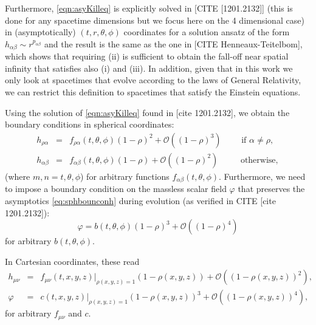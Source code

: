 \documentclass[a4paper,11pt]{article}
\begin{document}
Furthermore, \eqref{eqn:asyKilleq} is explicitly solved in [CITE [1201.2132]] (this is done for any spacetime dimensions but we focus here on the 4 dimensional case) in (asymptotically) $(t,r,\theta,\phi)$ coordinates for a solution ansatz of the form $h_{\alpha\beta}\sim r^{p_{\alpha\beta}}$ and the result is the same as the one in [CITE Henneaux-Teitelbom], which shows that requiring (ii) is sufficient to obtain the fall-off near spatial infinity that satisfies also (i) and (iii).
In addition, given that in this work we only look at spacetimes that evolve according to the laws of General Relativity, we can restrict this definition to spacetimes that satisfy the Einstein equations.

Using the solution of \eqref{eqn:asyKilleq} found in [cite 1201.2132], we obtain the boundary conditions in spherical coordinates:
\begin{eqnarray}
\label{eq:sphbounconh}
h_{\rho\alpha}&=&f_{\rho\alpha}(t,\theta,\phi)(1-\rho)^2+\mathcal{O}((1-\rho)^3) \qquad \textrm{ if $\alpha\neq\rho$}, \\ \nonumber
h_{\alpha\beta}&=&f_{\alpha\beta}(t,\theta,\phi)(1-\rho)+\mathcal{O}((1-\rho)^{2}) \qquad\; \textrm{ otherwise},
\end{eqnarray}
(where $m,n=t,\theta,\phi$) for arbitrary functions $f_{\alpha\beta}(t,\theta,\phi)$. Furthermore, we need to impose a boundary condition on the massless scalar field $\varphi$ that preserves the asymptotics \eqref{eq:sphbounconh} during evolution (as verified in CITE [cite 1201.2132]):
\begin{equation}\label{eq:sphbounconphi}
\varphi=b(t,\theta,\phi)(1-\rho)^3+\mathcal{O}((1-\rho)^4)
\end{equation}
for arbitrary $b(t,\theta,\phi)$.

In Cartesian coordinates, these read
\begin{eqnarray}
\label{eq:carbouncondh}
h_{\mu\nu}&=&f_{\mu\nu}(t,x,y,z)|_{\rho(x,y,z)=1}(1-\rho(x,y,z))+\mathcal{O}((1-\rho(x,y,z))^{2}), \\
\label{eq:carbouncondphi}
\varphi&=&c(t,x,y,z)|_{\rho(x,y,z)=1}(1-\rho(x,y,z))^3+\mathcal{O}((1-\rho(x,y,z))^{4}), 
\end{eqnarray}
for arbitrary $f_{\mu\nu}$ and $c$.
\end{document}
